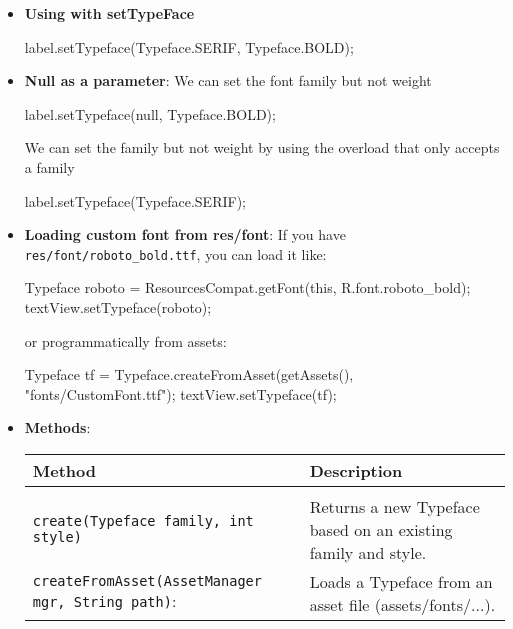\documentclass{report}
\begin{document}
\begin{itemize}
\begin{center}
\begin{tabular}{p{4cm}|p{1cm}}
                \end{tabular}
            \end{center}
        \item \textbf{Using with setTypeFace}
            \bigbreak \noindent 
            \begin{javacode}
            label.setTypeface(Typeface.SERIF, Typeface.BOLD);
            \end{javacode}
        \item \textbf{Null as a parameter}: We can set the font family but not weight
            \bigbreak \noindent 
            \begin{javacode}
            label.setTypeface(null, Typeface.BOLD);
            \end{javacode}
            \bigbreak \noindent 
            We can set the family but not weight by using the overload that only accepts a family
            \bigbreak \noindent 
            \begin{javacode}
            label.setTypeface(Typeface.SERIF);
            \end{javacode}
        \item \textbf{Loading custom font from res/font}: If you have \texttt{res/font/roboto\_bold.ttf}, you can load it like:
            \bigbreak \noindent 
            \begin{javacode}
                Typeface roboto = ResourcesCompat.getFont(this, R.font.roboto_bold);
                textView.setTypeface(roboto);
            \end{javacode}
            \bigbreak \noindent 
            or programmatically from assets:
            \bigbreak \noindent 
            \begin{javacode}
                Typeface tf = Typeface.createFromAsset(getAssets(), "fonts/CustomFont.ttf");
                textView.setTypeface(tf);
            \end{javacode}
        \item \textbf{Methods}:
            \bigbreak \noindent 
            \begin{center}
                \begin{tabular}{p{6cm}|p{6cm}}
                    Method	&Description \\
                    \hline \\[0.01cm]
                    \texttt{create(Typeface family, int style)}	&Returns a new Typeface based on an existing family and style. \\[2ex]
                    \texttt{createFromAsset(AssetManager mgr, String path)}:	&Loads a Typeface from an asset file (assets/fonts/...). \\[2ex]

\end{tabular}
\end{center}
\end{itemize}
\end{document}
